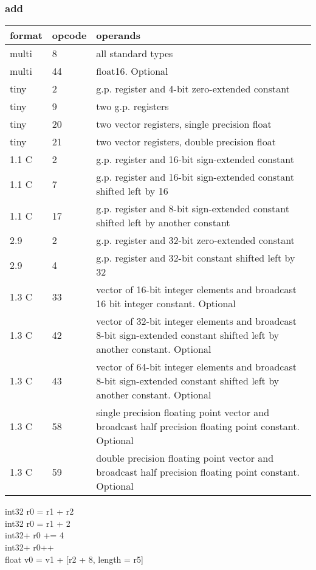 \documentclass[forwardcom.tex]{subfiles}
\begin{document}
\subsubsection{add}
\label{table:addInstruction}
\begin{tabular}{|p{12mm}|p{12mm}|p{110mm}|}
\hline
\bfseries format & \bfseries opcode & \bfseries operands \\ \hline
multi &  8 & all standard types \\ \hline
multi & 44 & float16. Optional \\ \hline
tiny  &  2 & g.p. register and 4-bit zero-extended constant \\ \hline
tiny  &  9 & two g.p. registers \\ \hline
tiny  & 20 & two vector registers, single precision float \\ \hline
tiny  & 21 & two vector registers, double precision float \\ \hline
1.1 C &  2 & g.p. register and 16-bit sign-extended constant \\ \hline
1.1 C &  7 & g.p. register and 16-bit sign-extended constant shifted left by 16 \\ \hline
1.1 C & 17 & g.p. register and 8-bit sign-extended constant shifted left by another constant \\ \hline
2.9   &  2 & g.p. register and 32-bit zero-extended constant \\ \hline
2.9   &  4 & g.p. register and 32-bit constant shifted left by 32 \\ \hline
1.3 C & 33 & vector of 16-bit integer elements and broadcast 16 bit integer constant. Optional \\ \hline
1.3 C & 42 & vector of 32-bit integer elements and broadcast 8-bit sign-extended constant shifted left by another constant. Optional \\ \hline
1.3 C & 43 & vector of 64-bit integer elements and broadcast 8-bit sign-extended constant shifted left by another constant. Optional \\ \hline
1.3 C & 58 & single precision floating point vector and broadcast half precision floating point constant. Optional \\ \hline
1.3 C & 59 & double precision floating point vector and broadcast half precision floating point constant. Optional \\ \hline
\end{tabular}
\vspace{2mm}

int32 r0 = r1 + r2 \\
int32 r0 = r1 + 2 \\
int32+ r0 += 4 \\
int32+ r0++ \\
float v0 = v1 + [r2 + 8, length = r5]
\vspace{2mm}
\end{document}
